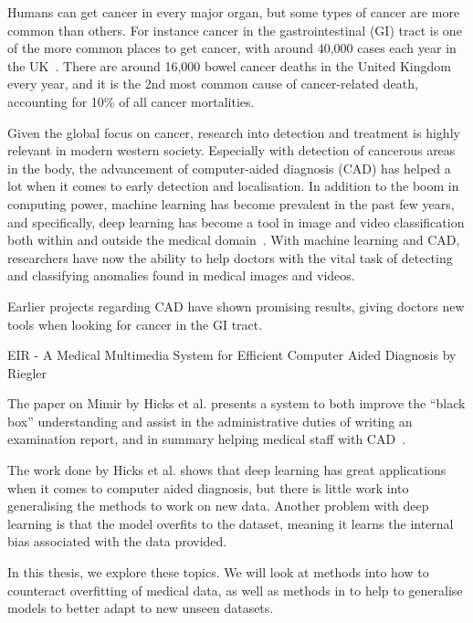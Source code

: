 Humans can get cancer in every major organ, but some types of cancer are more common than others.    
For instance cancer in the gastrointestinal (GI) tract is one of the more common places to get cancer, with around 40,000 cases each year in the UK~\cite{UKCancerBowel}. There are around 16,000 bowel cancer deaths in the United Kingdom every year, and it is the 2nd most common cause of cancer-related death, accounting for 10\% of all cancer mortalities.

Given the global focus on cancer, research into detection and treatment is highly relevant in modern western society. 
Especially with detection of cancerous areas in the body, the advancement of computer-aided diagnosis (CAD) has helped a lot when it comes to early detection and localisation. In addition to the boom in computing power, machine learning has become prevalent in the past few years, and specifically, deep learning has become a tool in image and video classification both within and outside the medical domain~\cite{NIPS2012_4824,DBLP:journals/corr/SimonyanZ14a,DBLP:journals/corr/SimonyanZ14a,DBLP:journals/corr/HeZRS15,DBLP:journals/corr/SzegedyIV16}. 
With machine learning and CAD, researchers have now the ability to help doctors with the vital task of detecting and classifying anomalies found in medical images and videos.

Earlier projects regarding CAD have shown promising results, giving doctors new tools when looking for cancer in the GI tract.

EIR - A Medical Multimedia System for Efficient
Computer Aided Diagnosis by Riegler 

The paper on Mimir by Hicks et al. presents a system to both improve the ``black box'' understanding and assist in the administrative duties of writing an examination report, and in summary helping medical staff with CAD~\cite{25953}. 

The work done by Hicks et al. shows that deep learning has great applications when it comes to computer aided diagnosis, but there is little work into generalising the methods to work on new data. Another problem with deep learning is that the model overfits to the dataset, meaning it learns the internal bias associated with the data provided. 

In this thesis, we explore these topics. We will look at methods into how to counteract overfitting of medical data, as well as methods in to help to generalise models to better adapt to new unseen datasets.

